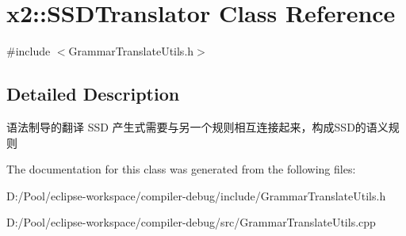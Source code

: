\hypertarget{classx2_1_1_s_s_d_translator}{}\section{x2\+:\+:S\+S\+D\+Translator Class Reference}
\label{classx2_1_1_s_s_d_translator}


{\ttfamily \#include $<$Grammar\+Translate\+Utils.\+h$>$}



\subsection{Detailed Description}
语法制导的翻译 S\+SD 产生式需要与另一个规则相互连接起来，构成\+S\+S\+D的语义规则 

The documentation for this class was generated from the following files\+:\begin{DoxyCompactItemize}
\item 
D\+:/\+Pool/eclipse-\/workspace/compiler-\/debug/include/Grammar\+Translate\+Utils.\+h\item 
D\+:/\+Pool/eclipse-\/workspace/compiler-\/debug/src/Grammar\+Translate\+Utils.\+cpp\end{DoxyCompactItemize}
